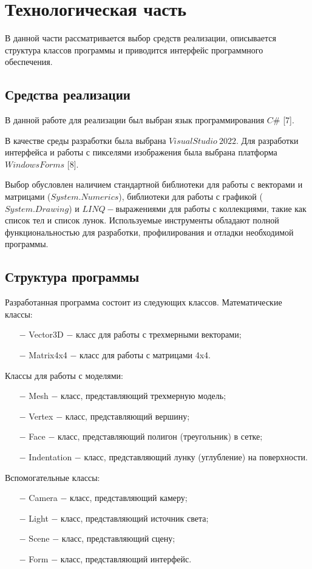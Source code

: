 \chapter{Технологическая часть}

В данной части рассматривается выбор средств реализации, описывается структура классов программы и приводится интерфейс программного обеспечения.

\section{Средства реализации}
В данной работе для реализации был выбран язык программирования $C\#$ [7].

В качестве среды разработки была выбрана $Visual Studio\ 2022$. Для разработки интерфейса и работы с пикселями изображения была выбрана платформа $Windows Forms$ [8].

Выбор обусловлен наличием стандартной библиотеки для работы с векторами и матрицами ($System.Numerics$), библиотеки для работы с графикой ($System.Drawing$) и $LINQ-$выражениями для работы с коллекциями, такие как список тел и список лунок. Используемые инструменты обладают полной функциональностью для разработки, профилирования и отладки необходимой программы. 

\section{Структура программы}
Разработанная программа состоит из следующих классов. Математические классы:
\begin{itemize}
    \item[$-$] Vector3D $-$ класс для работы с трехмерными векторами;
    \item[$-$] Matrix4x4 $-$ класс для работы с матрицами 4x4.
\end{itemize}

Классы для работы с моделями:
\begin{itemize}
    \item[$-$] Mesh $-$ класс, представляющий трехмерную модель;
    \item[$-$] Vertex $-$ класс, представляющий вершину;
    \item[$-$] Face $-$ класс, представляющий полигон (треугольник) в сетке;
    \item[$-$] Indentation $-$ класс, представляющий лунку (углубление) на поверхности.
\end{itemize}

Вспомогательные классы:
\begin{itemize}
    \item[$-$] Camera $-$ класс, представляющий камеру;
    \item[$-$] Light $-$ класс, представляющий источник света;
    \item[$-$] Scene $-$ класс, представляющий сцену;
    \item[$-$] Form $-$ класс, представляющий интерфейс.
\end{itemize}

